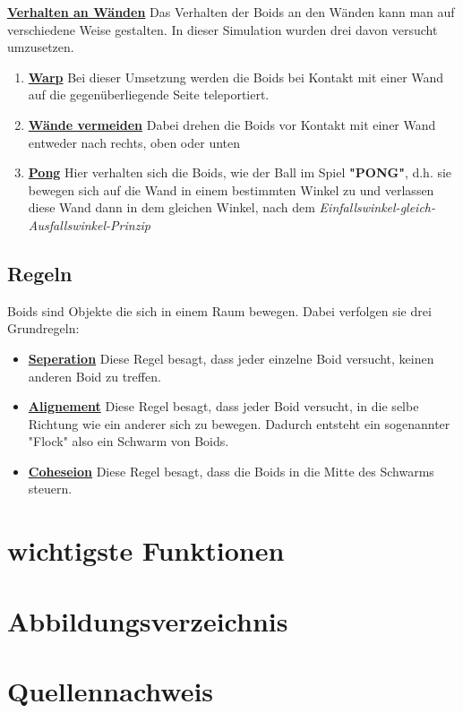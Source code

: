 \documentclass[a4paper, 12pt]{article}
\begin{document}
		\textbf{\underline{Verhalten an Wänden}}
		Das Verhalten der Boids an den Wänden kann man auf verschiedene Weise gestalten. In dieser Simulation wurden drei davon versucht umzusetzen. 
		\begin{enumerate}
			\item \underline{\textbf{Warp}}\linebreak
			Bei dieser Umsetzung werden die Boids bei Kontakt mit einer Wand auf die gegenüberliegende Seite teleportiert.
			
			\item \underline{\textbf{Wände vermeiden}}\linebreak
			Dabei drehen die Boids vor Kontakt mit einer Wand entweder nach rechts, oben oder unten
			
			\item \underline{\textbf{Pong}}\linebreak
			Hier verhalten sich die Boids, wie der Ball im Spiel \textbf{"PONG"}, d.h. sie bewegen sich auf die Wand in einem bestimmten Winkel zu und verlassen diese Wand dann in dem gleichen Winkel, nach dem \emph{Einfallswinkel-gleich-Ausfallswinkel-Prinzip}
		\end{enumerate}


	\subsection{Regeln}
	Boids sind Objekte die sich in einem Raum bewegen. Dabei verfolgen sie drei Grundregeln:
	\begin{itemize}
		\item\textbf{\underline{Seperation}}\linebreak
		Diese Regel besagt, dass jeder einzelne Boid versucht, keinen anderen Boid zu treffen. 
		\item\textbf{\underline{Alignement}}\linebreak
		Diese Regel besagt, dass jeder Boid versucht, in die selbe Richtung wie ein anderer sich zu bewegen. Dadurch entsteht ein sogenannter "Flock" also ein Schwarm von Boids.
		\item\textbf{\underline{Coheseion}}\linebreak
		Diese Regel besagt, dass die Boids in die Mitte des Schwarms steuern.
	\end{itemize}
		
	\newpage
	\section{wichtigste Funktionen}
	\newpage
	\section{Abbildungsverzeichnis}
	\newpage
	\section{Quellennachweis}
	\newpage
\end{document}
